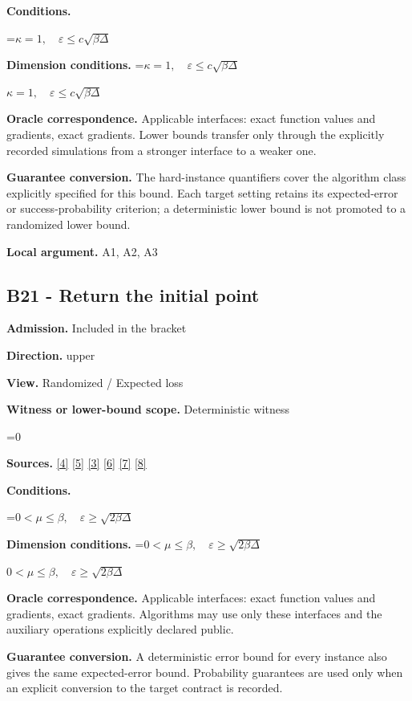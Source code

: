 \documentclass[10pt,a4paper]{article}
\newcommand{\AtlasMath}[1]{\par\begingroup\centering\setbox0=\hbox{$\displaystyle #1$}\ifdim\wd0>1.4\linewidth\typeout{ATLAS WIDE FORMULA: \the\wd0}\fi\ifdim\wd0>\linewidth\resizebox{\linewidth}{!}{\box0}\else\box0\fi\par\endgroup}
\newcommand{\AtlasInlineMath}[1]{\begingroup\setbox0=\hbox{$#1$}\ifdim\wd0>.4\linewidth\endgroup\AtlasMath{#1}\else\endgroup$#1$\fi}
\begin{document}
\textbf{Conditions.} 
\AtlasMath{\kappa=1,\quad\varepsilon\le c\sqrt{\beta\Delta}}


\textbf{Dimension conditions.} \AtlasInlineMath{\kappa=1,\quad\varepsilon\le c\sqrt{\beta\Delta}}

\textbf{Oracle correspondence.} Applicable interfaces: exact function values and gradients, exact gradients. Lower bounds transfer only through the explicitly recorded simulations from a stronger interface to a weaker one.

\textbf{Guarantee conversion.} The hard-instance quantifiers cover the algorithm class explicitly specified for this bound. Each target setting retains its expected-error or success-probability criterion; a deterministic lower bound is not promoted to a randomized lower bound.

\textbf{Local argument.} A1, A2, A3

\subsection{B21 - Return the initial point}
\textbf{Admission.} Included in the bracket

\textbf{Direction.} upper

\textbf{View.} Randomized / Expected loss

\textbf{Witness or lower-bound scope.} Deterministic witness

\AtlasMath{0}
\textbf{Sources.} \href{https://arxiv.org/pdf/2101.09740v2}{[4]} \href{https://arxiv.org/pdf/2609.33360v2}{[5]} \href{https://arxiv.org/pdf/2609.10874}{[3]} \href{https://arxiv.org/pdf/1405.4980}{[6]} \href{https://www2.isye.gatech.edu/~nemirovs/MOR_AccuracyCertificates.pdf}{[7]} \href{https://arxiv.org/pdf/2609.20701}{[8]}

\textbf{Conditions.} 
\AtlasMath{0<\mu\le\beta,\quad\varepsilon\ge\sqrt{2\beta\Delta}}


\textbf{Dimension conditions.} \AtlasInlineMath{0<\mu\le\beta,\quad\varepsilon\ge\sqrt{2\beta\Delta}}

\textbf{Oracle correspondence.} Applicable interfaces: exact function values and gradients, exact gradients. Algorithms may use only these interfaces and the auxiliary operations explicitly declared public.

\textbf{Guarantee conversion.} A deterministic error bound for every instance also gives the same expected-error bound. Probability guarantees are used only when an explicit conversion to the target contract is recorded.
\end{document}
